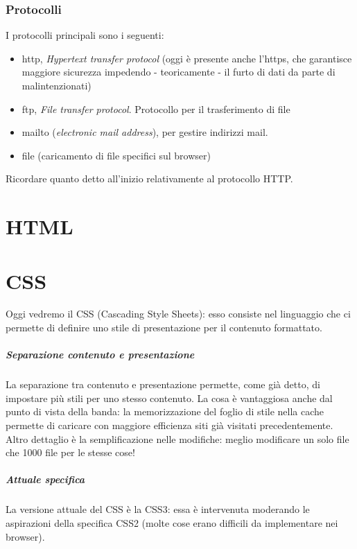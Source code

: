 \documentclass[11pt]{report}
\begin{document}
\subsection*{Protocolli}
I protocolli principali sono i seguenti:
\begin{itemize}
\item http, \emph{Hypertext transfer protocol} (oggi è presente anche l'https, che garantisce maggiore sicurezza impedendo - teoricamente - il furto di dati da parte di malintenzionati)
\item ftp, \emph{File transfer protocol}. Protocollo per il trasferimento di file
\item mailto (\emph{electronic mail address}), per gestire indirizzi mail.
\item file (caricamento di file specifici sul browser)
\end{itemize}
Ricordare quanto detto all'inizio relativamente al protocollo HTTP.

\chapter{HTML}



\chapter{CSS}
Oggi vedremo il CSS (Cascading Style Sheets): esso consiste nel linguaggio che ci permette di definire uno stile di presentazione per il contenuto formattato. 
\paragraph{Separazione contenuto e presentazione} La separazione tra contenuto e presentazione permette, come già detto, di impostare più stili per uno stesso contenuto. La cosa è vantaggiosa anche dal punto di vista della banda: la memorizzazione del foglio di stile nella cache permette di caricare con maggiore efficienza siti già visitati precedentemente. Altro dettaglio è la semplificazione nelle modifiche: meglio modificare un solo file che 1000 file per le stesse cose!

\paragraph{Attuale specifica} La versione attuale del CSS è la CSS3: essa è intervenuta moderando le aspirazioni della specifica CSS2 (molte cose erano difficili da implementare nei browser).
\end{document}
